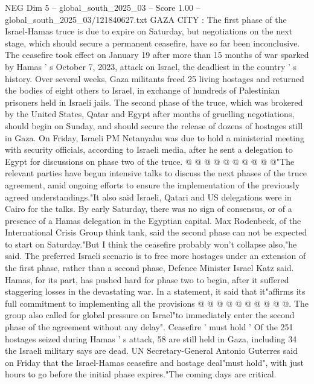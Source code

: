 \begin{textsample}{NEG Dim 5 – global\_south\_2025\_03 – Score 1.00 – global\_south\_2025\_03/121840627.txt}  \label{ex:f5_neg_263}
GAZA CITY : The first phase of the Israel-Hamas truce is due to expire on Saturday, but negotiations on the next stage, which should secure a permanent ceasefire, have so far been inconclusive.
The ceasefire took effect on January 19 after more than 15 months of war sparked by Hamas ' s October 7, 2023, attack on Israel, the deadliest in the country ' s history.
Over several weeks, Gaza militants freed 25 living hostages and returned the bodies of eight others to Israel, in exchange of hundreds of Palestinian prisoners held in Israeli jails.
The second phase of the truce, which was brokered by the United States, Qatar and Egypt after months of gruelling negotiations, should begin on Sunday, and should secure the release of dozens of hostages still in Gaza.
On Friday, Israeli PM Netanyahu was due to hold a ministerial meeting with security officials, according to Israeli media, after he sent a delegation to Egypt for discussions on phase two of the truce. @ @ @ @ @ @ @ @ @ @"The relevant parties have begun intensive talks to discuss the next phases of the truce agreement, amid ongoing efforts to ensure the implementation of the previously agreed understandings."It also said Israeli, Qatari and US delegations were in Cairo for the talks.
By early Saturday, there was no sign of consensus, or of a presence of a Hamas delegation in the Egyptian capital.
Max Rodenbeck, of the International Crisis Group think tank, said the second phase can not be expected to start on Saturday."But I think the ceasefire probably won't collapse also,"he said.
The preferred Israeli scenario is to free more hostages under an extension of the first phase, rather than a second phase, Defence Minister Israel Katz said.
Hamas, for its part, has pushed hard for phase two to begin, after it suffered staggering losses in the devastating war.
In a statement, it said that it"affirms its full commitment to implementing all the provisions @ @ @ @ @ @ @ @ @ @.
The group also called for global pressure on Israel"to immediately enter the second phase of the agreement without any delay".
Ceasefire ' must hold ' Of the 251 hostages seized during Hamas ' s attack, 58 are still held in Gaza, including 34 the Israeli military says are dead.
UN Secretary-General Antonio Guterres said on Friday that the Israel-Hamas ceasefire and hostage deal"must hold", with just hours to go before the initial phase expires."The coming days are critical.

\end{textsample}
